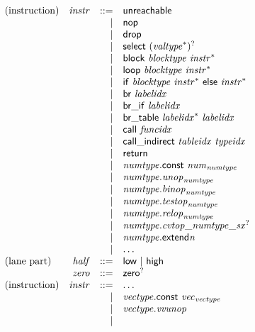 $$
\begin{array}{@{}lrrl@{}l@{}}
\mbox{(instruction)} & {\mathit{instr}} &::=& \mathsf{unreachable} \\ &&|&
\mathsf{nop} \\ &&|&
\mathsf{drop} \\ &&|&
\mathsf{select}~{({{\mathit{valtype}}^\ast})^?} \\ &&|&
\mathsf{block}~{\mathit{blocktype}}~{{\mathit{instr}}^\ast} \\ &&|&
\mathsf{loop}~{\mathit{blocktype}}~{{\mathit{instr}}^\ast} \\ &&|&
\mathsf{if}~{\mathit{blocktype}}~{{\mathit{instr}}^\ast}~\mathsf{else}~{{\mathit{instr}}^\ast} \\ &&|&
\mathsf{br}~{\mathit{labelidx}} \\ &&|&
\mathsf{br\_if}~{\mathit{labelidx}} \\ &&|&
\mathsf{br\_table}~{{\mathit{labelidx}}^\ast}~{\mathit{labelidx}} \\ &&|&
\mathsf{call}~{\mathit{funcidx}} \\ &&|&
\mathsf{call\_indirect}~{\mathit{tableidx}}~{\mathit{typeidx}} \\ &&|&
\mathsf{return} \\ &&|&
{\mathit{numtype}}.\mathsf{const}~{{\mathit{num}}}_{{\mathit{numtype}}} \\ &&|&
{\mathit{numtype}} . {{\mathit{unop}}}_{{\mathit{numtype}}} \\ &&|&
{\mathit{numtype}} . {{\mathit{binop}}}_{{\mathit{numtype}}} \\ &&|&
{\mathit{numtype}} . {{\mathit{testop}}}_{{\mathit{numtype}}} \\ &&|&
{\mathit{numtype}} . {{\mathit{relop}}}_{{\mathit{numtype}}} \\ &&|&
{\mathit{numtype}} . {{{{{\mathit{cvtop}}}{\mathsf{\_}}}{{\mathit{numtype}}}}{\mathsf{\_}}}{{{\mathit{sx}}^?}} \\ &&|&
{{\mathit{numtype}}.\mathsf{extend}}{{\mathit{n}}} \\ &&|&
\dots \\
\mbox{(lane part)} & {\mathit{half}} &::=& \mathsf{low} ~|~ \mathsf{high} \\
& {\mathit{zero}} &::=& {\mathsf{zero}^?} \\
\mbox{(instruction)} & {\mathit{instr}} &::=& \dots \\ &&|&
{\mathit{vectype}}.\mathsf{const}~{{\mathit{vec}}}_{{\mathit{vectype}}} \\ &&|&
{\mathit{vectype}} . {\mathit{vvunop}} \\ &&|&

\end{array}$$
